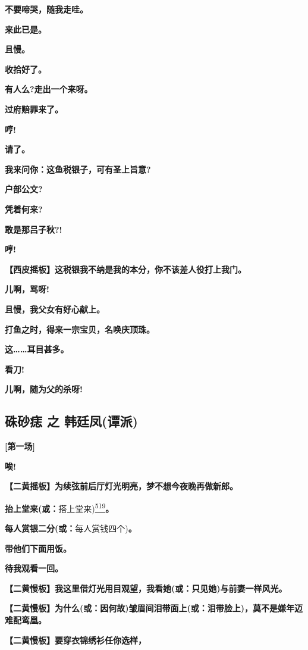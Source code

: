 \textbf{不要啼哭，随我走哇。}

\textbf{来此已是。}

\textbf{且慢。}

\textbf{收拾好了。}

\textbf{有人么?走出一个来呀。}

\textbf{过府赔罪来了。}

\textbf{哼!}

\textbf{请了。}

\textbf{我来问你：这鱼税银子，可有圣上旨意?}

\textbf{户部公文?}

\textbf{凭着何来?}

\textbf{敢是那吕子秋?!}

\textbf{哼!}

\textbf{【西皮摇板】这税银我不纳是我的本分，你不该差人役打上我门。}

\textbf{儿啊，骂呀!}

\textbf{且慢，我父女有好心献上。}

\textbf{打鱼之时，得来一宗宝贝，名唤庆顶珠。}

\textbf{这\ldots{}\ldots{}耳目甚多。}

\textbf{看刀!}

\textbf{儿啊，随为父的杀呀!}

\newpage
\hypertarget{ux7843ux7802ux75e3-ux4e4b-ux97e9ux5ef7ux51e4ux8c2dux6d3e}{%
\subsection{硃砂痣 之
韩廷凤(谭派)}\label{ux7843ux7802ux75e3-ux4e4b-ux97e9ux5ef7ux51e4ux8c2dux6d3e}}

\textbf{{[}第一场{]}}

\textbf{唉!}

\textbf{【二黄摇板】为续弦前后厅灯光明亮，梦不想今夜晚再做新郎。}

\textbf{抬上堂来(或：}搭上堂来)\protect\hyperlink{fn519}{\textsuperscript{519}}\textbf{。}

\textbf{每人赏银二分(或：}每人赏钱四个)\textbf{。}

\textbf{带他们下面用饭。}

\textbf{待我观看一回。}

\textbf{【二黄慢板】我这里借灯光用目观望，我看她(或：只见她)与前妻一样风光。}

\textbf{【二黄慢板】为什么(或：因何故)皱眉间泪带面上(或：泪带脸上)，莫不是嫌年迈难配鸾凰。}

\textbf{【二黄慢板】要穿衣锦绣衫任你选样，}

